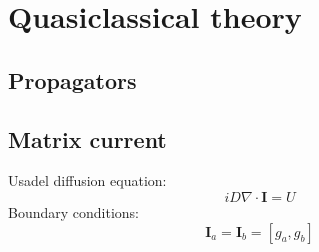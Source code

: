 \chapter{Quasiclassical theory}
\section{Propagators}
\section{Matrix current}
Usadel diffusion equation:
\begin{equation}
  iD \nabla\cdot\mathbf{I} = U
\end{equation}
Boundary conditions:
\begin{equation}
  \mathbf{I}_a = \mathbf{I}_b = [g_a, g_b]
\end{equation}
